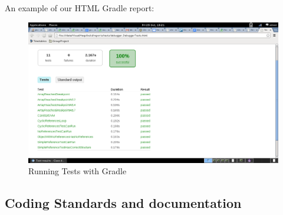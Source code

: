 \documentclass[10pt, a4paper]{article}
\begin{document}
An example of our HTML Gradle report:

\begin{figure}[h]
	\centering
	\includegraphics[width=\textwidth]{images/testresults.png}
	\caption{Running Tests with Gradle}
\end{figure}

\subsection{Coding Standards and documentation}
\end{document}
